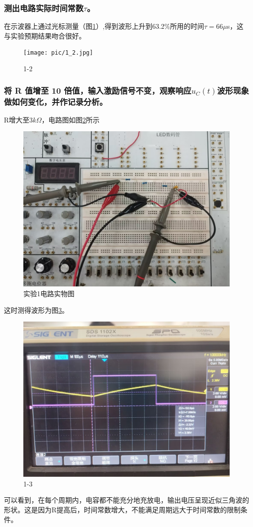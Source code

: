 \documentclass{ctexart}
\begin{document}
\subsubsection{测出电路实际时间常数$\tau$。}
在示波器上通过光标测量（图\ref{fig:1-2}）,得到波形上升到63.2\%所用的时间$\tau=66\mu$s，这与实验预期结果吻合很好。
\begin{figure}
    \centering
    \texttt{[image: pic/1\_2.jpg]}
    \caption{1-2}
    \label{fig:1-2}
\end{figure}
\subsubsection{将 R 值增至 10 倍值，输入激励信号不变，观察响应$u_C(t)$波形现象做如何变化，并作记录分析。}
R增大至3$k\Omega$，电路图如图\ref{fig:实验1电路实物图}所示
\begin{figure}
    \centering
    \includegraphics[scale=0.2]{pic/1_circuit.jpg}
    \caption{实验1电路实物图}
    \label{fig:实验1电路实物图}
\end{figure}
这时测得波形为图\ref{fig:1-3}。
\begin{figure}
    \centering
    \includegraphics[scale=0.2]{pic/1_3.jpg}
    \caption{1-3}
    \label{fig:1-3}
\end{figure}
可以看到，在每个周期内，电容都不能充分地充放电，输出电压呈现近似三角波的形状。这是因为R提高后，时间常数增大，不能满足周期远大于时间常数的限制条件。
\end{document}
